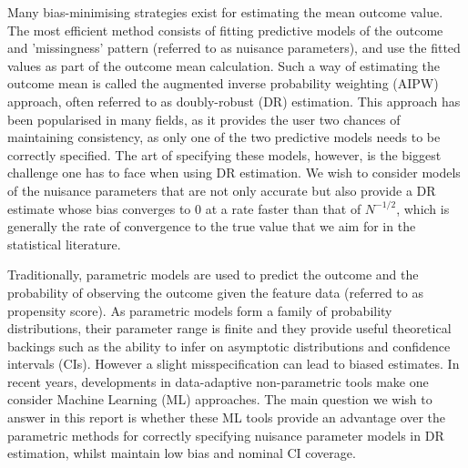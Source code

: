 \documentclass[12pt,twoside]{article}
\begin{document}
Many bias-minimising strategies exist for estimating the mean outcome value. The most efficient method consists of fitting predictive models of the outcome and 'missingness' pattern (referred to as nuisance parameters), and use the fitted values as part of the outcome mean calculation. Such a way of estimating the outcome mean is called the augmented inverse probability weighting (AIPW) approach, often referred to as doubly-robust (DR) estimation. This approach has been popularised in many fields, as it provides the user two chances of maintaining consistency, as only one of the two predictive models needs to be correctly specified. The art of specifying these models, however, is the biggest challenge one has to face when using DR estimation. We wish to consider models of the nuisance parameters that are not only accurate but also provide a DR estimate whose bias converges to 0 at a rate faster than that of $N^{-1/2}$, which is generally the rate of convergence to the true value that we aim for in the statistical literature.

Traditionally, parametric models are used to predict the outcome and the probability of observing the outcome given the feature data (referred to as propensity score). As parametric models form a family of probability distributions, their parameter range is finite and they provide useful theoretical backings such as the ability to infer on asymptotic distributions and confidence intervals (CIs). However a slight misspecification can lead to biased estimates. In recent years, developments in data-adaptive non-parametric tools make one consider Machine Learning (ML) approaches. The main question we wish to answer in this report is whether these ML tools provide an advantage over the parametric methods for correctly specifying nuisance parameter models in DR estimation, whilst maintain low bias and nominal CI coverage.
 
\end{document}
